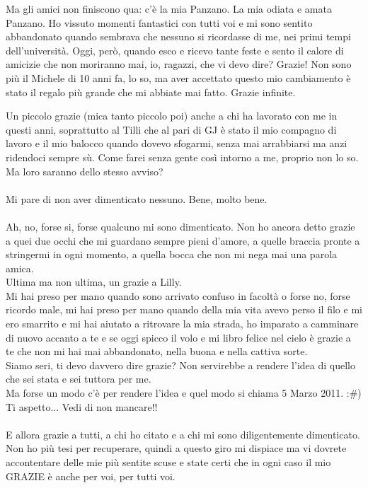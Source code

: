 Ma gli amici non finiscono qua: c'è la mia Panzano. La mia odiata e amata Panzano. Ho vissuto momenti fantastici con tutti voi e mi sono sentito abbandonato quando sembrava che nessuno si ricordasse di me, nei primi tempi dell'università. Oggi, però, quando esco e ricevo tante feste e sento il calore di amicizie che non moriranno mai, io, ragazzi, che vi devo dire? Grazie! Non sono più il Michele di 10 anni fa, lo so, ma aver accettato questo mio cambiamento è stato il regalo più grande che mi abbiate mai fatto. Grazie infinite.

Un piccolo grazie (mica tanto piccolo poi) anche a chi ha lavorato con me in questi anni, soprattutto al Tilli che al pari di GJ è stato il mio compagno di lavoro e il mio balocco quando dovevo sfogarmi, senza mai arrabbiarsi ma anzi ridendoci sempre sù. Come farei senza gente così intorno a me, proprio non lo so. Ma loro saranno dello stesso avviso?

\paragraph{}

Mi pare di non aver dimenticato nessuno. Bene, molto bene.

\paragraph{}

Ah, no, forse si, forse qualcuno mi sono dimenticato. Non ho ancora detto grazie a quei due occhi che mi guardano sempre pieni d'amore, a quelle braccia pronte a stringermi in ogni momento, a quella bocca che non mi nega mai una parola amica.\\
Ultima ma non ultima, un grazie a Lilly.\\
Mi hai preso per mano quando sono arrivato confuso in facoltà o forse no, forse ricordo male, mi hai preso per mano quando della mia vita avevo perso il filo e mi ero smarrito e mi hai aiutato a ritrovare la mia strada, ho imparato a camminare di nuovo accanto a te e se oggi spicco il volo e mi libro felice nel cielo è grazie a te che non mi hai mai abbandonato, nella buona e nella cattiva sorte.\\
Siamo seri, ti devo davvero dire grazie? Non servirebbe a rendere l'idea di quello che sei stata e sei tuttora per me.\\
Ma forse un modo c'è per rendere l'idea e quel modo si chiama 5 Marzo 2011. :\#)\\
Ti aspetto... Vedi di non mancare!!

\paragraph{}

E allora grazie a tutti, a chi ho citato e a chi mi sono diligentemente dimenticato. Non ho più tesi per recuperare, quindi a questo giro mi dispiace ma vi dovrete accontentare delle mie più sentite scuse e state certi che in ogni caso il mio GRAZIE è anche per voi, per tutti voi.
